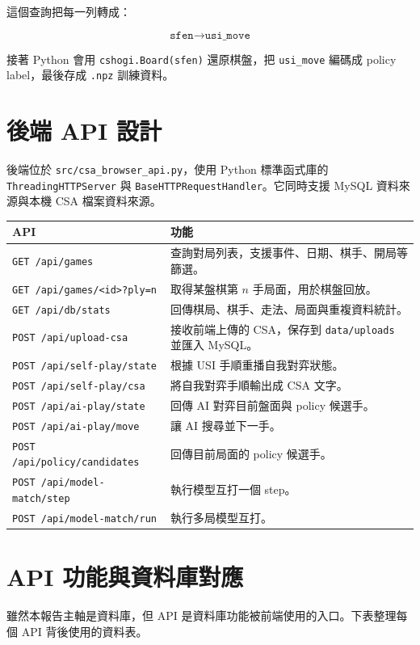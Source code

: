 \documentclass[12pt,a4paper,fontset=none]{ctexart}
\begin{document}
這個查詢把每一列轉成：

\[
\texttt{sfen} \rightarrow \texttt{usi\_move}
\]

接著 Python 會用 \texttt{cshogi.Board(sfen)} 還原棋盤，把 \texttt{usi\_move} 編碼成 policy label，最後存成 \texttt{.npz} 訓練資料。

\section{後端 API 設計}

後端位於 \texttt{src/csa\_browser\_api.py}，使用 Python 標準函式庫的 \texttt{ThreadingHTTPServer} 與 \texttt{BaseHTTPRequestHandler}。它同時支援 MySQL 資料來源與本機 CSA 檔案資料來源。

\begin{longtable}{p{}p{}}
\toprule
\textbf{API} & \textbf{功能}\\
\midrule
\endhead
\texttt{GET /api/games} & 查詢對局列表，支援事件、日期、棋手、開局等篩選。\\
\texttt{GET /api/games/<id>?ply=n} & 取得某盤棋第 $n$ 手局面，用於棋盤回放。\\
\texttt{GET /api/db/stats} & 回傳棋局、棋手、走法、局面與重複資料統計。\\
\texttt{POST /api/upload-csa} & 接收前端上傳的 CSA，保存到 \texttt{data/uploads} 並匯入 MySQL。\\
\texttt{POST /api/self-play/state} & 根據 USI 手順重播自我對弈狀態。\\
\texttt{POST /api/self-play/csa} & 將自我對弈手順輸出成 CSA 文字。\\
\texttt{POST /api/ai-play/state} & 回傳 AI 對弈目前盤面與 policy 候選手。\\
\texttt{POST /api/ai-play/move} & 讓 AI 搜尋並下一手。\\
\texttt{POST /api/policy/candidates} & 回傳目前局面的 policy 候選手。\\
\texttt{POST /api/model-match/step} & 執行模型互打一個 step。\\
\texttt{POST /api/model-match/run} & 執行多局模型互打。\\
\bottomrule
\end{longtable}


\section{API 功能與資料庫對應}

雖然本報告主軸是資料庫，但 API 是資料庫功能被前端使用的入口。下表整理每個 API 背後使用的資料表。
\end{document}
